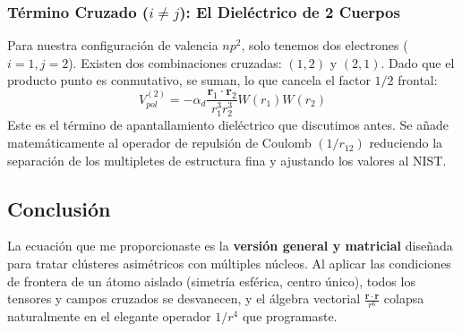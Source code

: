 \documentclass[11pt,a4paper]{article}
\begin{document}
\subsubsection{Término Cruzado ($i \neq j$): El Dieléctrico de 2 Cuerpos}
Para nuestra configuración de valencia $np^2$, solo tenemos dos electrones ($i=1, j=2$).
Existen dos combinaciones cruzadas: $(1,2)$ y $(2,1)$. Dado que el producto punto es conmutativo, se suman, lo que cancela el factor $1/2$ frontal:
\begin{equation}
V_{pol}^{(2)} = -\alpha_d \frac{\mathbf{r}_1 \cdot \mathbf{r}_2}{r_1^3 r_2^3} W(r_1)W(r_2)
\end{equation}
Este es el término de apantallamiento dieléctrico que discutimos antes. Se añade matemáticamente al operador de repulsión de Coulomb $(1/r_{12})$ reduciendo la separación de los multipletes de estructura fina y ajustando los valores al NIST.

\subsection{Conclusión}
La ecuación que me proporcionaste es la \textbf{versión general y matricial} diseñada para tratar clústeres asimétricos con múltiples núcleos. Al aplicar las condiciones de frontera de un átomo aislado (simetría esférica, centro único), todos los tensores y campos cruzados se desvanecen, y el álgebra vectorial $\frac{\mathbf{r} \cdot \mathbf{r}}{r^6}$ colapsa naturalmente en el elegante operador $1/r^4$ que programaste.
\end{document}
